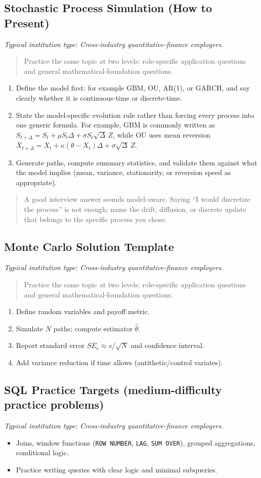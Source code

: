 \documentclass[11pt,letterpaper,openany]{book}
\newcommand{\RoleProfile}[2]{%
  \subsection{#1}%
  \noindent\textit{Typical institution type: #2.}\par
}
\newcommand{\playbooknote}[1]{\begin{quote}\small #1\end{quote}}
\begin{document}
\RoleProfile{Stochastic Process Simulation (How to Present)}{Cross-industry quantitative-finance employers}
\playbooknote{Practice the same topic at two levels: role-specific application questions and general mathematical-foundation questions.}
\begin{enumerate}
  \item Define the model first: for example GBM, OU, AR(1), or GARCH, and say clearly whether it is continuous-time or discrete-time.
  \item State the model-specific evolution rule rather than forcing every process into one generic formula. For example, GBM is commonly written as $S_{t+\Delta} = S_t + \mu S_t\Delta + \sigma S_t\sqrt{\Delta}\,Z$, while OU uses mean reversion $X_{t+\Delta} = X_t + \kappa(\theta - X_t)\Delta + \sigma\sqrt{\Delta}\,Z$.
  \item Generate paths, compute summary statistics, and validate them against what the model implies (mean, variance, stationarity, or reversion speed as appropriate).
\end{enumerate}
\playbooknote{A good interview answer sounds model-aware. Saying ``I would discretize the process'' is not enough; name the drift, diffusion, or discrete update that belongs to the specific process you chose.}

\RoleProfile{Monte Carlo Solution Template}{Cross-industry quantitative-finance employers}
\playbooknote{Practice the same topic at two levels: role-specific application questions and general mathematical-foundation questions.}
\begin{enumerate}
  \item Define random variables and payoff metric.
  \item Simulate $N$ paths; compute estimator $\hat{\theta}$.
  \item Report standard error $SE_c \approx s/\sqrt{N}$ and confidence interval.
  \item Add variance reduction if time allows (antithetic/control variates).
\end{enumerate}

\RoleProfile{SQL Practice Targets (medium-difficulty practice problems)}{Cross-industry quantitative-finance employers}
\begin{itemize}
  \item Joins, window functions (\texttt{ROW NUMBER}, \texttt{LAG}, \texttt{SUM OVER}), grouped aggregations, conditional logic.
  \item Practice writing queries with clear logic and minimal subqueries.
\end{itemize}
\end{document}
